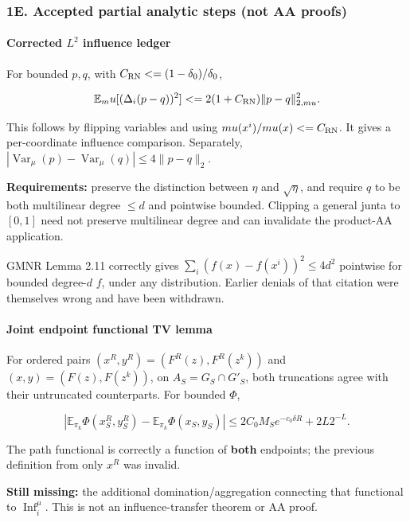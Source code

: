 \subsubsection{1E. Accepted partial analytic steps (not AA proofs)}\label{e.-accepted-partial-analytic-steps-not-aa-proofs}

\paragraph{\texorpdfstring{Corrected \(L^2\) influence ledger}{Corrected L\^{}2 influence ledger}}\label{corrected-l2-influence-ledger}

For bounded \(p,q\), with \(C_{\rm RN}\le(1-\delta_0)/\delta_0\),

\[\mathbb E_\mu[(\Delta_i(p-q))^2]
\le2(1+C_{\rm RN})\|p-q\|_{2,\mu}^2.\]

This follows by flipping variables and using \(\mu(x^i)/\mu(x)\le C_{\rm RN}\). It gives a per-coordinate influence comparison. Separately, \(|\operatorname{Var}_\mu(p)-\operatorname{Var}_\mu(q)|\le4\|p-q\|_2\).

\textbf{Requirements:} preserve the distinction between \(\eta\) and \(\sqrt\eta\), and require \(q\) to be both multilinear degree \(\le d\) and pointwise bounded. Clipping a general junta to \([0,1]\) need not preserve multilinear degree and can invalidate the product-AA application.

GMNR Lemma 2.11 correctly gives \(\sum_i(f(x)-f(x^i))^2\le4d^2\) pointwise for bounded degree-\(d\) \(f\), under any distribution. Earlier denials of that citation were themselves wrong and have been withdrawn.

\paragraph{Joint endpoint functional TV lemma}\label{joint-endpoint-functional-tv-lemma}

For ordered pairs \((x^R,y^R)=(F^R(z),F^R(z^k))\) and \((x,y)=(F(z),F(z^k))\), on \(A_S=G_S\cap G'_S\), both truncations agree with their untruncated counterparts. For bounded \(\Phi\),

\[\left|\mathbb E_{\pi_k}\Phi(x_S^R,y_S^R)-\mathbb E_{\pi_k}\Phi(x_S,y_S)\right|
\le 2C_0M_Se^{-c_0\delta R}+2L2^{-L}.\]

The path functional is correctly a function of \textbf{both} endpoints; the previous definition from only \(x^R\) was invalid.

\textbf{Still missing:} the additional domination/aggregation connecting that functional to \(\operatorname{Inf}_i^\mu\). This is not an influence-transfer theorem or AA proof.
